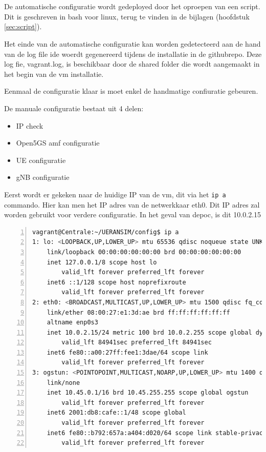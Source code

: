 \section{}%
\label{sec:Config}%

De automatische configuratie wordt gedeployed door het oproepen van een script. Dit is geschreven in bash voor linux, terug te vinden in de bijlagen (hoofdstuk \ref{sec:script}).

Het einde van de automatische configuratie kan worden gedetecteerd aan de hand van de log file ide woerdt gegenereerd tijdens de installatie in de githubrepo. Deze log fie, vagrant.log, is beschikbaar door de shared folder die wordt aangemaakt in het begin van de \gls{vm} installatie. 

Eenmaal de configuratie klaar is moet enkel de handmatige confiuratie gebeuren.

De manuale configuratie bestaat uit 4 delen:

\begin{itemize}
    \item IP check
    \item Open5GS \gls{amf} configuratie
    \item UE configuratie
    \item gNB configuratie
\end{itemize}

Eerst wordt er gekeken naar de huidige IP van de \gls{vm}, dit via het \verb|ip a| commando. Hier kan men het IP adres van de netwerkkaar eth0. Dit IP adres zal worden gebruikt voor verdere configuratie. In het geval van de\gls{poc}, is dit 10.0.2.15

\begin{lstlisting}[basicstyle=\small, frame=single, breaklines=true, postbreak=\mbox{\textcolor{red}{$\hookrightarrow$}\space}, escapeinside ={\%,}, escapechar={!}, numbers=left, language=sh, caption=IP configuratie]
vagrant@Centrale:~/UERANSIM/config$ ip a
1: lo: <LOOPBACK,UP,LOWER_UP> mtu 65536 qdisc noqueue state UNKNOWN group default qlen 1000
    link/loopback 00:00:00:00:00:00 brd 00:00:00:00:00:00
    inet 127.0.0.1/8 scope host lo
        valid_lft forever preferred_lft forever
    inet6 ::1/128 scope host noprefixroute
        valid_lft forever preferred_lft forever
2: eth0: <BROADCAST,MULTICAST,UP,LOWER_UP> mtu 1500 qdisc fq_codel state UP group default qlen 1000
    link/ether 08:00:27:e1:3d:ae brd ff:ff:ff:ff:ff:ff
    altname enp0s3
    inet 10.0.2.15/24 metric 100 brd 10.0.2.255 scope global dynamic eth0
        valid_lft 84941sec preferred_lft 84941sec
    inet6 fe80::a00:27ff:fee1:3dae/64 scope link
        valid_lft forever preferred_lft forever
3: ogstun: <POINTOPOINT,MULTICAST,NOARP,UP,LOWER_UP> mtu 1400 qdisc fq_codel state UP group default qlen 500
    link/none
    inet 10.45.0.1/16 brd 10.45.255.255 scope global ogstun
        valid_lft forever preferred_lft forever
    inet6 2001:db8:cafe::1/48 scope global
        valid_lft forever preferred_lft forever
    inet6 fe80::b792:657a:a404:d020/64 scope link stable-privacy
        valid_lft forever preferred_lft forever
\end{lstlisting}

